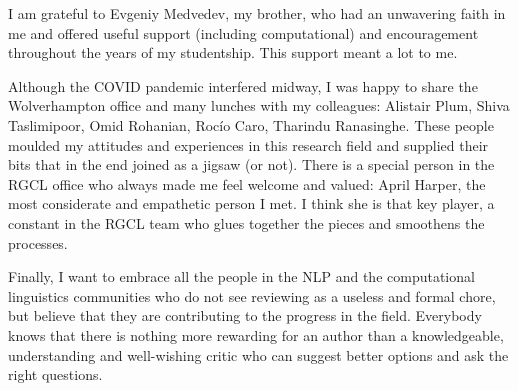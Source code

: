 I am grateful to Evgeniy Medvedev, my brother, who had an unwavering faith in me and offered useful support (including computational) and encouragement throughout the years of my studentship. This support meant a lot to me. 

Although the COVID pandemic interfered midway, I was happy to share the Wolverhampton office and many lunches with my colleagues: Alistair Plum, Shiva Taslimipoor, Omid Rohanian, Rocío Caro, Tharindu Ranasinghe. These people moulded my attitudes and experiences in this research field and supplied their bits that in the end joined as a jigsaw (or not). There is a special person in the RGCL office who always made me feel welcome and valued: April Harper, the most considerate and empathetic person I met. I think she is that key player, a constant in the RGCL team who glues together the pieces and smoothens the processes.

Finally, I want to embrace all the people in the NLP and the computational linguistics communities who do not see reviewing as a useless and formal chore, but believe that they are contributing to the progress in the field. Everybody knows that there is nothing more rewarding for an author than a knowledgeable, understanding and well-wishing critic who can suggest better options and ask the right questions. 


